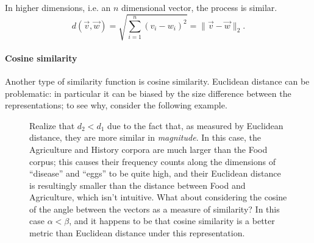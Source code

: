 \documentclass[12pt]{article}
\begin{document}
In higher dimensions, i.e. an $n$ dimensional vector, the process is similar.
\[
  d(\vec v,\vec w) = \sqrt{\sum_{i=1}^{n} \left(v_i - w_i\right)^2} = \|\vec v - \vec w\|_2.
\]

\paragraph{Cosine similarity} Another type of similarity function is cosine similarity. Euclidean distance can be problematic: in particular it can be biased by the size difference between the representations; to see why, consider the following example.

\begin{figure}[h]
\begin{center}
  \caption{Realize that $d_2 < d_1$ due to the fact that, as measured by Euclidean distance, they are more similar in \emph{magnitude}. In this case, the Agriculture and History corpora are much larger than the Food corpus; this causes their frequency counts along the dimensions of ``disease'' and ``eggs'' to be quite high, and their Euclidean distance is resultingly smaller than the distance between Food and Agriculture, which isn't intuitive. What about considering the cosine of the angle between the vectors as a measure of similarity? In this case $\alpha < \beta$, and it happens to be that cosine similarity is a better metric than Euclidean distance under this representation.}
\end{center}
\end{figure}
\end{document}
